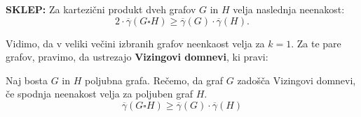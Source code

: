 
\noindent \textbf{SKLEP:} Za kartezični produkt dveh grafov \(G\) in \(H\) velja naslednja neenakost:
\[
2 \cdot \overline{\gamma}(G \square H) \geq \overline{\gamma}(G) \cdot \overline{\gamma}(H).
\]

\vspace{6pt}


\noindent Vidimo, da v veliki večini izbranih grafov neenkaost velja za $k = 1$. Za te pare grafov, pravimo, da ustrezajo \textbf{Vizingovi domnevi}, ki pravi:  

\begin{center}
  \noindent Naj bosta \(G\) in \(H\) poljubna grafa. Rečemo, da graf \(G\) zadošča Vizingovi domnevi, če spodnja neenakost velja za poljuben graf \(H\). 
\[
\overline{\gamma}(G \square H) \geq \overline{\gamma}(G) \cdot \overline{\gamma}(H)
\]
  
\end{center}
